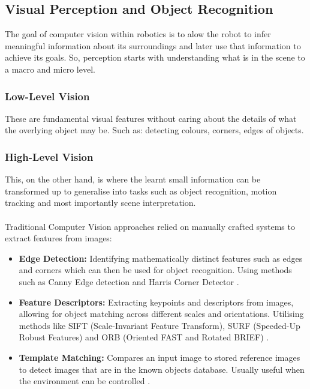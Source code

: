 \subsection{Visual Perception and Object Recognition}
  The goal of computer vision within robotics is to alow the robot to infer meaningful information about its surroundings and later use that information to achieve its goals. So, perception starts with understanding what is in the scene to a macro and micro level. 
  
  \subsubsection{Low-Level Vision}
    These are fundamental visual features without caring about the details of what the overlying object may be. Such as: detecting colours, corners, edges of objects. 

  \subsubsection{High-Level Vision}
    This, on the other hand, is where the learnt small information can be transformed up to generalise into tasks such as object recognition, motion tracking and most importantly scene interpretation.
    \\\\
    Traditional Computer Vision approaches relied on manually crafted systems to extract features from images:
    \begin{itemize}
      \item \textbf{Edge Detection:} Identifying mathematically distinct features such as edges and corners \cite{marr1980theory} which can then be used for object recognition. Using methods such as Canny Edge detection \cite{canny1986computational} and Harris Corner Detector \cite{derpanis2004harris}.
      \item \textbf{Feature Descriptors:} Extracting keypoints and descriptors from images, allowing for object matching across different scales and orientations. Utilising methods like SIFT (Scale-Invariant Feature Transform), SURF (Speeded-Up Robust Features) \cite{wu2013comparative,juan2009comparison} and ORB (Oriented FAST and Rotated BRIEF) \cite{rublee2011orb}.
      \item \textbf{Template Matching:} Compares an input image to stored reference images to detect images that are in the known objects database. Usually useful when the environment can be controlled \cite{brunelli2009template}.
    \end{itemize}

